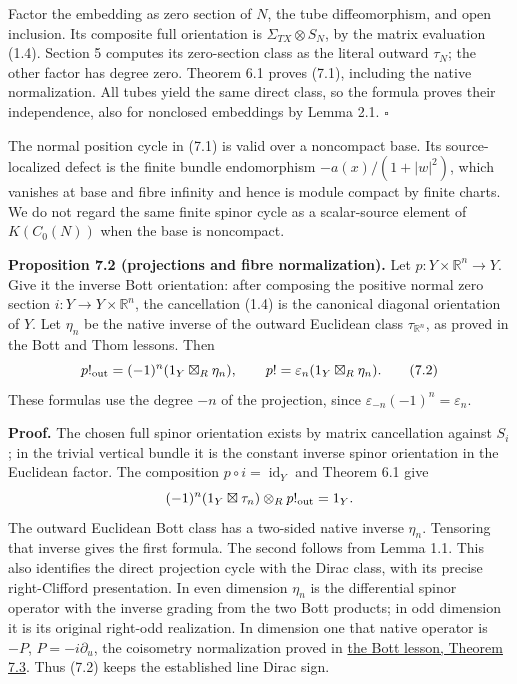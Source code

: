 \documentclass[
  11pt,
]{article}
\begin{document}
Factor the embedding as zero section of \(N\), the tube diffeomorphism,
and open inclusion. Its composite full orientation is
\(\Sigma_{TX}\otimes S_N\), by the matrix evaluation (1.4). Section 5
computes its zero-section class as the literal outward \(\tau_N\); the
other factor has degree zero. Theorem 6.1 proves (7.1), including the
native normalization. All tubes yield the same direct class, so the
formula proves their independence, also for nonclosed embeddings by
Lemma 2.1. \(\square\)

The normal position cycle in (7.1) is valid over a noncompact base. Its
source-localized defect is the finite bundle endomorphism
\(-a(x)/(1+|w|^2)\), which vanishes at base and fibre infinity and hence
is module compact by finite charts. We do not regard the same finite
spinor cycle as a scalar-source element of \(K(C_0(N))\) when the base
is noncompact.

\textbf{Proposition 7.2 (projections and fibre normalization).} Let
\(p:Y\times\mathbb R^n\to Y\). Give it the inverse Bott orientation:
after composing the positive normal zero section
\(i:Y\to Y\times\mathbb R^n\), the cancellation (1.4) is the canonical
diagonal orientation of \(Y\). Let \(\eta_n\) be the native inverse of
the outward Euclidean class \(\tau_{\mathbb R^n}\), as proved in the
Bott and Thom lessons. Then \[
 p!_{\rm out}=(-1)^n(1_Y\boxtimes_R\eta_n),\qquad
 p!=\varepsilon_n(1_Y\boxtimes_R\eta_n).
 \tag{7.2}
\] These formulas use the degree \(-n\) of the projection, since
\(\varepsilon_{-n}(-1)^n=\varepsilon_n\).

\textbf{Proof.} The chosen full spinor orientation exists by matrix
cancellation against \(S_i\); in the trivial vertical bundle it is the
constant inverse spinor orientation in the Euclidean factor. The
composition \(p\circ i=\operatorname{id}_Y\) and Theorem 6.1 give \[
 (-1)^n(1_Y\boxtimes\tau_n)\otimes_Rp!_{\rm out}=1_Y.
\] The outward Euclidean Bott class has a two-sided native inverse
\(\eta_n\). Tensoring that inverse gives the first formula. The second
follows from Lemma 1.1. This also identifies the direct projection cycle
with the Dirac class, with its precise right-Clifford presentation. In
even dimension \(\eta_n\) is the differential spinor operator with the
inverse grading from the two Bott products; in odd dimension it is its
original right-odd realization. In dimension one that native operator is
\(-P\), \(P=-i\partial_u\), the coisometry normalization proved in
\href{KT-KK-12.html\#7-the-one-dimensional-extension-cycles}{the Bott
lesson, Theorem 7.3}. Thus (7.2) keeps the established line Dirac sign.
\end{document}
